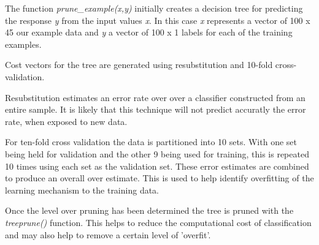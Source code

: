 The function \emph{prune\_example(x,y)} initially creates a decision tree for predicting the response \emph{y} from the input
values \emph{x}. In this case \emph{x} represents a vector of 100 x 45 our
example data and \emph{y} a vector of 100 x 1 labels for each of the training
examples.

Cost vectors for the tree are generated using resubstitution and 10-fold
cross-validation.

Resubstitution estimates an error rate over over a classifier constructed from
an entire sample. It is likely that this technique will not predict accuratly
the error rate, when exposed to new data.

For ten-fold cross validation the data is partitioned into 10 sets. With one
set being held for validation and the other 9 being used for training, this is
repeated 10 times using each set as the validation set. These error estimates are
combined to produce an overall over estimate. This is used to help identify
overfitting of the learning mechanism to the training data.

Once the level over pruning has been determined the tree is pruned with the
\emph{treeprune()} function. This helps to reduce the computational cost of
classification and may also help to remove a certain level of 'overfit'.

\begin{figure}[h!]
    \centering
\end{figure}
